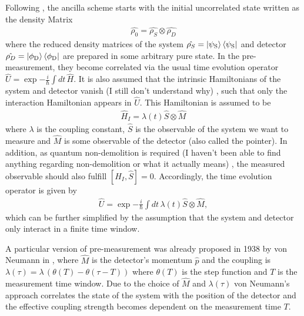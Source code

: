\documentclass{article}
\newcommand\sj[1]{ {\color{orange} #1} }
\begin{document}
Following \cite{svenssonPedagogicalWeak2013}, the ancilla scheme starts with the initial uncorrelated 
state written as the density Matrix
\begin{align}
    \hat{\rho_0} =  \hat{\rho_S} \otimes  \hat{\rho_D}
\end{align}
where the reduced density matrices of the system $\hat{\rho_S} = \ket{\psi_{\rm S}} \bra{\psi_{\rm S}}$ and detector 
$\hat{\rho_D} = \ket{\phi_{\rm D}} \bra{\phi_{\rm D}}$ are prepared in some arbitrary pure state. In the pre-measurement, they 
become correlated via the usual time evolution operator $\hat{U} = \exp{ -\frac{i}{\hbar} \int dt \, \hat{H}}$. It is
also assumed that the intrinsic Hamiltonians of the system and detector vanish \cite{PreskillQuantum,svenssonPedagogicalWeak2013,tamirWeakMeasurements2013} 
\sj{(I still don't understand why)}, 
such that only the interaction Hamiltonian appears in $\hat{U}$. This Hamiltonian is assumed to be
\begin{align}
    \hat{H}_{I} = \lambda (t) \hat{S} \otimes \hat{M}
\end{align}
where $\lambda$ is the coupling constant, $\hat{S}$ is the observable of the system we want to measure and $\hat{M}$
is some observable of the detector (also called the pointer). In addition, as quantum non-demolition is required \cite{svenssonPedagogicalWeak2013} \sj{(I haven't been able to find anything regarding non-demolition or what it actually means)}, 
the measured observable should also fulfill $[\hat{H}_I, \hat{S}]=0$. Accordingly, the time evolution operator is given by 
\begin{align}
    \hat{U} = \exp{ -\frac{i}{\hbar} \int dt \,  \lambda (t) \hat{S}\otimes \hat{M} },
\end{align}
which can be further simplified by the assumption that the system and detector only interact in a 
finite time window. 

A particular version of pre-measurement was already proposed in 1938 by von Neumann in 
\cite{vonNeumannFoundationsQuantum2018}, where $\hat{M}$ is the detector's momentum $\hat{p}$ and the 
coupling is $\lambda (\tau) = \lambda \, (\theta (T) - \theta(\tau - T))$ where $\theta (T)$ is 
the step function and $T$ is the measurement time window. Due to the choice of $\hat{M}$ and $\lambda(\tau)$
von Neumann's approach correlates the state of the system with the position of the detector and the  effective coupling strength becomes dependent on the measurement time $T$. 
\end{document}
